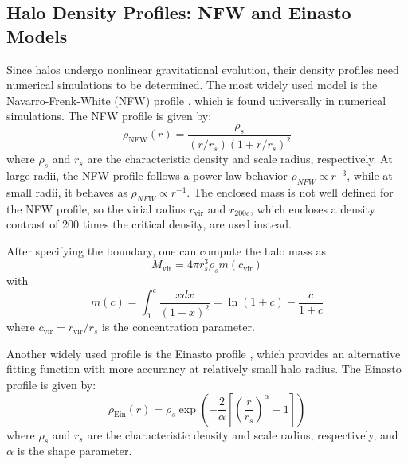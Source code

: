 \subsection{Halo Density Profiles: NFW and Einasto Models}
Since halos undergo nonlinear gravitational evolution, their density profiles need numerical simulations to be determined. The most widely used model is the Navarro-Frenk-White (NFW) profile \citep{1996ApJ...462..563N, 1997ApJ...490..493N}, which is found universally in numerical simulations. The NFW profile is given by:
\begin{equation}
    \rho_\text{NFW}(r) = \frac{\rho_s}{(r/r_s)(1 + r/r_s)^2}
\end{equation}
where $\rho_s$ and $r_s$ are the characteristic density and scale radius, respectively. At large radii, the NFW profile follows a power-law behavior $\rho_{NFW} \propto r^{-3}$, while at small radii, it behaves as $\rho_{NFW} \propto r^{-1}$. The enclosed mass is not well defined for the NFW profile, so the virial radius $r_{\text{vir}}$ and $r_{200c}$, which encloses a density contrast of 200 times the critical density, are used instead.

After specifying the boundary, one can compute the halo mass as \citep{2011MNRAS.414.1851O}:
\begin{equation}
    M_{\text{vir}} = 4\pi r_s^3 \rho_s m(c_{\text{vir}})
\end{equation}
with
\begin{equation}
    m(c) = \int_0^{c} \frac{x dx}{(1 + x)^2} = \ln(1 + c) - \frac{c}{1 + c}
\end{equation}
where $c_{\text{vir}} = r_{\text{vir}}/r_s$ is the concentration parameter. 

Another widely used profile is the Einasto profile \citep{1965TrAlm...5...87E}, which provides an alternative fitting function with more accurancy at relatively small halo radius. The Einasto profile is given by:
\begin{equation}
    \rho_{\text{Ein}}(r) = \rho_s \exp \left( -\frac{2}{\alpha} \left[ \left( \frac{r}{r_s} \right)^\alpha - 1 \right] \right)
\end{equation}
where $\rho_s$ and $r_s$ are the characteristic density and scale radius, respectively, and $\alpha$ is the shape parameter. 